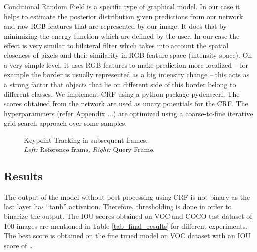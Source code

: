 \documentclass[conference]{IEEEtran}
\begin{document}
Conditional Random Field is a specific type of graphical model. In our case it helps to estimate the posterior distribution given predictions from our network and raw RGB features that are represented by our image. It does that by minimizing the energy function which are defined by the user. In our case the effect is very similar to bilateral filter which takes into account the spatial closeness of pixels and their similarity in RGB feature space (intensity space). On a very simple level, it uses RGB features to make prediction more localized – for example the border is usually represented as a big intensity change – this acts as a strong factor that objects that lie on different side of this border belong to different classes. We implement CRF using a python package pydensecrf.
The scores obtained from the network are used as unary potentials for the CRF. The hyperparameters (refer Appendix ...) are optimized using a coarse-to-fine iterative grid search approach over some samples.

\begin{figure}[htbp]
\caption{ Keypoint Tracking in subsequent frames. \\ \textit{Left:} Reference frame, \textit{Right:} Query Frame.}
\label{fig:dm}
\end{figure}
\subsection{Results}
The output of the model without post processing using CRF is not binary as the last layer has ``tanh'' activation. Therefore, thresholding is done in order to binarize the output.
The IOU scores obtained on VOC and COCO test dataset of 100 images are mentioned in Table \ref{tab_final_results} for different experiments. The best score is obtained on the fine tuned model on VOC dataset with an IOU score of \ldots .
\end{document}

